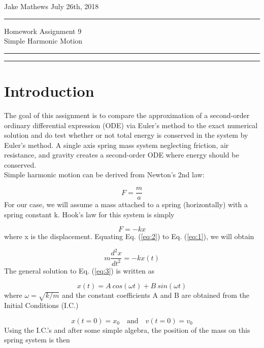 \documentclass{article}
\begin{document}
\noindent
Jake Mathews \hfill July 26th, 2018

\hrule
\begin{center}
\large {Homework Assignment 9}\\ \large{Simple Harmonic Motion}
\end{center}
\hrule
\vspace{1pt}
\hrule height 1pt

\section{Introduction}
The goal of this assignment is to compare the approximation of a second-order ordinary differential expression (ODE) via Euler's method to the exact numerical solution and do test whether or not total energy is conserved in the system by Euler's method. A single axis spring mass system neglecting friction, air resistance, and gravity creates a second-order ODE where energy should be conserved.\\

\noindent
Simple harmonic motion can be derived from Newton’s 2nd law:

\begin{equation}
\label{eq:1}
F = \frac{m}{a}
\end{equation}
For our case, we will assume a mass attached to a spring (horizontally) with a spring constant k. Hook’s law for this system is simply

\begin{equation}
\label{eq:2}
F = -kx
\end{equation}
where x is the displacement. Equating Eq. (\ref{eq:2}) to Eq. (\ref{eq:1}), we will obtain

\begin{equation}
\label{eq:3}
m \frac{d^2 x}{dt^2}= -kx(t)
\end{equation}
The general solution to Eq. (\ref{eq:3}) is written as

\begin{equation}
\label{eq:4}
x(t) = A \ cos(\omega t) + B \ sin(\omega t)
\end{equation}
where $\omega = \sqrt{k / m}$ and the constant coefficients A and B are obtained from the Initial Conditions (I.C.)

\begin{equation}
\label{eq:5}
x(t = 0) = x_0
	\quad\text{and}\quad  
v(t = 0) = v_0
\end{equation}
Using the I.C.’s and after some simple algebra, the position of the mass on this spring system is then
\end{document}
